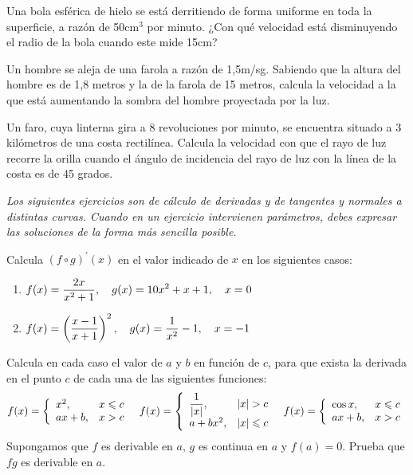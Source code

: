 \begin{ejercicios propuestos}
\propuesto Una bola esférica de hielo se está derritiendo de forma
uniforme en toda la superficie, a razón de 50cm$^{3}$ por minuto.
¿Con qué velocidad está disminuyendo el radio de la bola cuando este
mide 15cm?

\propuesto Un hombre se aleja de una farola a razón de 1,5m/sg. Sabiendo
que la altura del hombre es de 1,8 metros y la de la farola de 15
metros, calcula la velocidad a la que está aumentando la sombra del
hombre proyectada por la luz.

\propuesto Un faro, cuya linterna gira a 8 revoluciones por minuto,
se encuentra situado a 3 kilómetros de una costa rectilínea. Calcula
la velocidad con que el rayo de luz recorre la orilla cuando el ángulo
de incidencia del rayo de luz con la línea de la costa es de 45 grados.

\bigskip{}

\emph{Los siguientes ejercicios son de cálculo de derivadas y de tangentes
y normales a distintas curvas. Cuando en un ejercicio intervienen
parámetros, debes expresar las soluciones de la forma más sencilla
posible.}

\bigskip{}

\propuesto Calcula $(f\circ g)^{\prime}(x)$ en el valor indicado
de $x$ en los siguientes casos: 
\begin{enumerate}
\item $\displaystyle{f(x)=\frac{2x}{x^{2}+1},\quad g(x)=10x^{2}+x+1,\quad x=0}$ 
\item $\displaystyle{f(x)=\left(\frac{x-1}{x+1}\right)^{2},\quad g(x)=\frac{1}{x^{2}}-1,\quad x=-1}$ 
\end{enumerate}
\propuesto Calcula en cada caso el valor de $a$ y $b$ en función
de $c$, para que exista la derivada en el punto $c$ de cada una
de las siguientes funciones: 
\[
f(x)=\left\{ \begin{array}{ll}
x^{2}, & x\leqslant c\\
ax+b, & x>c
\end{array}\right.\ \ f(x)=\left\{ \begin{array}{ll}
\dfrac{1}{\lvert{x}\rvert}, & \lvert{x}\rvert>c\\
a+bx^{2}, & \lvert{x}\rvert\leqslant c
\end{array}\right.\ \ f(x)=\left\{ \begin{array}{ll}
\cos x, & x\leqslant c\\
ax+b, & x>c
\end{array}\right.
\]
\propuesto Supongamos que $f$ es derivable en $a$, $g$ es continua
en $a$ y $f(a)=0$. Prueba que $fg$ es derivable en $a$.


\end{ejercicios propuestos}
